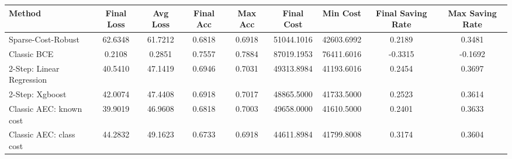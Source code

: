 \begin{tabular}{lcccccccc}
\toprule
Method & Final Loss & Avg Loss & Final Acc & Max Acc & Final Cost & Min Cost & Final Saving Rate & Max Saving Rate \\
\midrule
Sparse-Cost-Robust & 62.6348 & 61.7212 & 0.6818 & 0.6918 & 51044.1016 & 42603.6992 & 0.2189 & 0.3481 \\
Classic BCE & 0.2108 & 0.2851 & 0.7557 & 0.7884 & 87019.1953 & 76411.6016 & -0.3315 & -0.1692 \\
2-Step: Linear Regression & 40.5410 & 47.1419 & 0.6946 & 0.7031 & 49313.8984 & 41193.6016 & 0.2454 & 0.3697 \\
2-Step: Xgboost & 42.0074 & 47.4408 & 0.6918 & 0.7017 & 48865.5000 & 41733.5000 & 0.2523 & 0.3614 \\
Classic AEC: known cost & 39.9019 & 46.9608 & 0.6818 & 0.7003 & 49658.0000 & 41610.5000 & 0.2401 & 0.3633 \\
Classic AEC: class cost & 44.2832 & 49.1623 & 0.6733 & 0.6918 & 44611.8984 & 41799.8008 & 0.3174 & 0.3604 \\
\bottomrule
\end{tabular}
